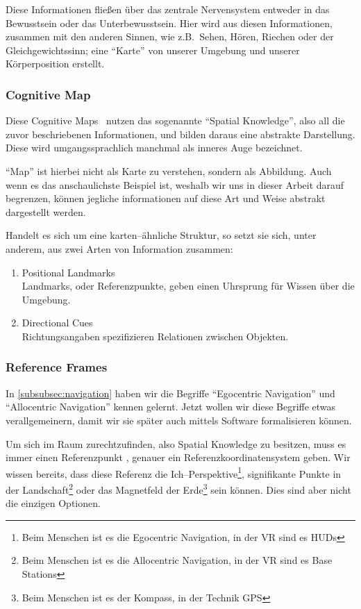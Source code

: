         Diese Informationen fließen über das zentrale Nervensystem entweder in das Bewusstsein oder das Unterbewusstsein.
        Hier wird aus diesen Informationen, zusammen mit den anderen Sinnen, wie z.B.\ Sehen, Hören, Riechen oder der Gleichgewichtssinn; eine \enquote{Karte} von unserer Umgebung und unserer Körperposition erstellt.

    \subsubsection{Cognitive Map}\label{subsubsec:cognitive-map}
        Diese Cognitive Maps~\autocite{wikipedia-contributors-2023I} nutzen das sogenannte \enquote{Spatial Knowledge}, also all die zuvor beschriebenen Informationen, und bilden daraus eine abstrakte Darstellung.
        Diese wird umgangssprachlich manchmal als inneres Auge bezeichnet.

        \enquote{Map} ist hierbei nicht als Karte zu verstehen, sondern als Abbildung.
        Auch wenn es das anschaulichste Beispiel ist, weshalb wir uns in dieser Arbeit darauf begrenzen, können jegliche informationen auf diese Art und Weise abstrakt dargestellt werden.

        Handelt es sich um eine karten--ähnliche Struktur, so setzt sie sich, unter anderem, aus zwei Arten von Information zusammen:
        \begin{enumerate}
            \item Positional Landmarks\\
            Landmarks, oder Referenzpunkte, geben einen Uhrsprung für Wissen über die Umgebung.
            \item Directional Cues\\
            Richtungsangaben spezifizieren Relationen zwischen Objekten.
        \end{enumerate}

    \subsubsection{Reference Frames}\label{subsubsec:reference-frames}
        In \autoref{subsubsec:navigation} haben wir die Begriffe \enquote{Egocentric Navigation} und \enquote{Allocentric Navigation} kennen gelernt.
        Jetzt wollen wir diese Begriffe etwas verallgemeinern, damit wir sie später auch mittels Software formalisieren können.

        Um sich im Raum zurechtzufinden, also Spatial Knowledge zu besitzen, muss es immer einen Referenzpunkt \autocite{wikipedia-contributors-2023F}, genauer ein Referenzkoordinatensystem geben.
        Wir wissen bereits, dass diese Referenz die Ich--Perspektive\footnote{Beim Menschen ist es die Egocentric Navigation, in der VR sind es HUDs}, signifikante Punkte in der Landschaft\footnote{Beim Menschen ist es die Allocentric Navigation, in der VR sind es Base Stations} oder das Magnetfeld der Erde\footnote{Beim Menschen ist es der Kompass, in der Technik GPS} sein können.
        Dies sind aber nicht die einzigen Optionen.

